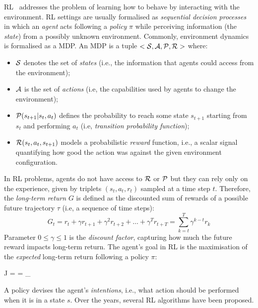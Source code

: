 \ac{RL}~\cite{sutton2018reinforcement-learning} addresses 
 the problem of learning how to behave 
 by interacting with the environment.
\ac{RL} settings are usually formalised 
 as \emph{sequential decision processes} in which an \emph{agent} acts 
following a \emph{policy} $\pi$ while perceiving information (the \emph{state})
from a possibly unknown environment. 
%
Commonly, environment dynamics is formalised as a \ac{MDP}.
%
An \ac{MDP} is a tuple $<\mathcal{S}, \mathcal{A}, \mathcal{P}, \mathcal{R}>$ where:
\begin{itemize}
  \item $\mathcal{S}$ denotes the set of \emph{states} 
   (i.e., the information that agents could access from the environment);
  \item $\mathcal{A}$ is the set of \emph{actions} 
   (i.e, the capabilities used by agents to change the environment);
  \item $\mathcal{P}(s_{t + 1} | s_t, a_t)$ defines the probability 
    to reach some state $s_{t + 1}$ starting from $s_t$ 
    and performing $a_t$ (i.e, \emph{transition probability function});
  \item $\mathcal{R}(s_t, a_t, s_{t+1})$ models a probabilistic \emph{reward} function, i.e., a scalar signal quantifying how good the action was against the given environment configuration.
\end{itemize}
%
In \ac{RL} problems, 
 agents do not have access to $\mathcal{R}$ or $\mathcal{P}$ 
 but they can rely only on the experience,
 given by triplets $(s_t, a_t, r_t)$ 
 sampled at a time step $t$. 
Therefore, the \emph{long-term return} $G$ 
 is defined as the discounted sum of rewards 
 of a possible future trajectory $\tau$ 
 (i.e, a sequence of time steps):
\begin{equation}
G_{t} = r_t + \gamma r_{t + 1} + \gamma^2 r_{t + 2} + \dots + \gamma^T r_{t + T} = \sum_{k = t}^T \gamma^{k-t} r_k
\end{equation}
Parameter $0 \leq \gamma \leq 1$ is the \emph{discount factor}, 
 capturing how much the future reward impacts long-term return.
The agent's goal in \ac{RL} is the maximisation 
 of the \emph{expected} long-term return following a policy $\pi$:
\begin{iequation}
J = \big[ G_t \big] = \RE_\pi \big[ \sum_{k = t}^T \gamma^{t-k} r_k \big] 
\end{iequation}
A policy devises the agent's \emph{intentions}, 
 i.e., what action should be performed when it is in a state $s$.
%
Over the years, several \ac{RL} algorithms have been proposed. 

